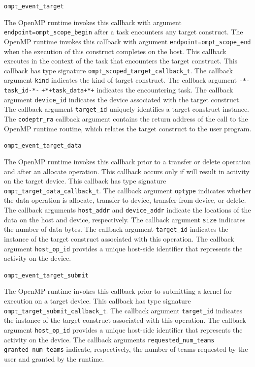 \documentclass{article}
\providecommand{\DIFaddbegin}{} %
\providecommand{\DIFaddend}{} %
\providecommand{\DIFdelbegin}{} %
\providecommand{\DIFdelend}{} %
\begin{document}
\begin{description}

\item \lstinline|ompt_event_target|

The OpenMP runtime invokes this callback with argument \lstinline|endpoint=ompt_scope_begin| after a task encounters any target construct. 
The OpenMP runtime invokes this callback with argument \lstinline|endpoint=ompt_scope_end| when the execution of this construct completes on the host. 
This callback executes in the context of the task that encounters the target construct.
This callback has type signature \lstinline|ompt_scoped_target_callback_t|.
The callback argument \lstinline|kind| indicates the kind of target construct.
The callback argument \DIFdelbegin \lstinline|-*-task_id-*-| %
\DIFdelend \DIFaddbegin\lstinline|+*+task_data+*+| \DIFaddend indicates the encountering task.
The callback argument \lstinline|device_id| indicates the device associated with the target  construct.
The callback argument \lstinline|target_id| uniquely identifies a target construct instance. 
The \lstinline|codeptr_ra| callback argument contains the return address of the call to the OpenMP runtime routine, which relates the target construct to the user program. 

\item \lstinline|ompt_event_target_data|

The OpenMP runtime invokes this callback prior to a transfer or delete operation and after an allocate operation. 
This callback occurs only if will result in activity on the target device.
This callback has type signature \lstinline|ompt_target_data_callback_t|.
The callback argument \lstinline|optype| indicates  whether the data operation is allocate, transfer to device, transfer from device, or delete.
The callback arguments \lstinline|host_addr| and \lstinline|device_addr|  indicate the locations of the data on the host and device, respectively.
The callback argument \lstinline|size| indicates the number of data bytes.
The callback argument \lstinline|target_id| indicates the instance of the target construct associated with this operation.
The callback argument \lstinline|host_op_id| provides a unique host-side identifier that represents the activity on the device.

\item \lstinline|ompt_event_target_submit|

The OpenMP runtime invokes this callback prior to submitting a kernel for execution on a target device. 
This callback has type signature \lstinline|ompt_target_submit_callback_t|.
The callback argument \lstinline|target_id| indicates the instance of the target construct associated with this operation.
The callback argument \lstinline|host_op_id| provides a unique host-side identifier that represents the activity on the device.
The callback arguments \lstinline|requested_num_teams|  \lstinline|granted_num_teams| indicate, respectively, the number of teams requested by the user and granted by the runtime.

\end{description}
\end{document}
